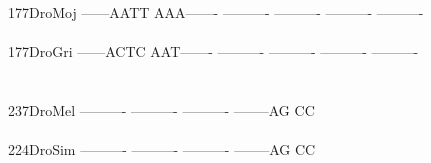\documentclass[11pt,twoside,reqno,a4paper]{article}
\begin{document}
{177\hspace*{2\charwidth}DroMoj	------AATT	AAA-------	----------	----------	----------	----------	\\
\hspace*{5\charwidth}\hspace*{7\charwidth}\hspace*{1\charwidth}\hspace*{1\charwidth}\hspace*{1\charwidth}\hspace*{1\charwidth}\hspace*{1\charwidth}\hspace*{1\charwidth}\\
177\hspace*{2\charwidth}DroGri	------ACTC	AAT-------	----------	----------	----------	----------	\\
\hspace*{5\charwidth}\hspace*{7\charwidth}\hspace*{1\charwidth}\hspace*{1\charwidth}\hspace*{1\charwidth}\hspace*{1\charwidth}\hspace*{1\charwidth}\hspace*{1\charwidth}\\
\\
237\hspace*{2\charwidth}DroMel	----------	----------	----------	--------AG	CC\\
\hspace*{5\charwidth}\hspace*{7\charwidth}\hspace*{1\charwidth}\hspace*{1\charwidth}\hspace*{1\charwidth}\hspace*{1\charwidth}\\
224\hspace*{2\charwidth}DroSim	----------	----------	----------	--------AG	CC\\
\hspace*{5\charwidth}\hspace*{7\charwidth}\hspace*{1\charwidth}\hspace*{1\charwidth}\hspace*{1\charwidth}\hspace*{1\charwidth}\\
}
\end{document}
